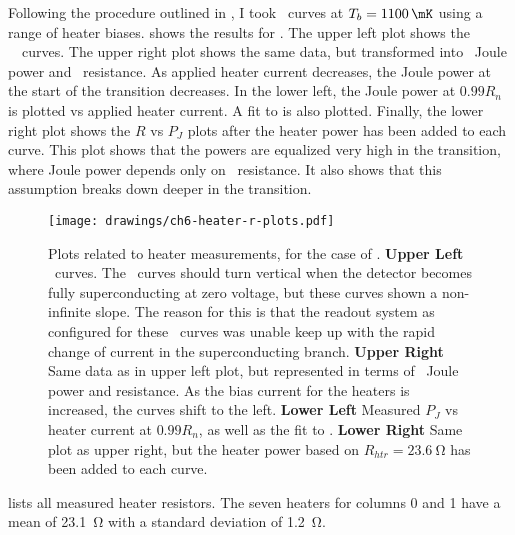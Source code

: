 Following the procedure outlined in , I took \IV\ curves at $T_b = \SI{1100}{\mK}$ using a range of heater biases.
 shows the results for .
The upper left plot shows the \TES\ \IV\ curves.
The upper right plot shows the same data, but transformed into \TES\ Joule power and \TES\ resistance.
As applied heater current decreases, the Joule power at the start of the transition decreases.
In the lower left, the Joule power at $0.99R_{n}$ is plotted vs applied heater current.
A fit to  is also plotted.
Finally, the lower right plot shows the $R$ vs $P_J$ plots after the heater power has been added to each curve.
This plot shows that the powers are equalized very high in the transition, where Joule power depends only on \TES\ resistance.
It also shows that this assumption breaks down deeper in the transition.

\begin{figure*}
\texttt{[image: drawings/ch6-heater-r-plots.pdf]}
\caption[Plots related to heater measurements]{
Plots related to heater measurements, for the case of .
\textbf{Upper Left} \IV\ curves. The \IV\ curves should turn vertical when the detector becomes fully superconducting at zero voltage, but these curves shown a non-infinite slope. The reason for this is that the readout system as configured for these \IV\ curves was unable keep up with the rapid change of current in the superconducting branch.
\textbf{Upper Right} Same data as in upper left plot, but represented in terms of \TES\ Joule power and resistance. As the bias current for the heaters is increased, the curves shift to the left.
\textbf{Lower Left} Measured $P_{J}$ vs heater current at $0.99R_n$, as well as the fit to .
\textbf{Lower Right} Same plot as upper right, but the heater power based on $R_{htr} = \SI{23.6}{\ohm}$ has been added to each curve.
}
\label{fig:ch6-heater-r-plots}
\end{figure*}

 lists all measured heater resistors.
The seven heaters for columns 0 and 1 have a mean of \SI{23.1}{\ohm} with a standard deviation of \SI{1.2}{\ohm}.

